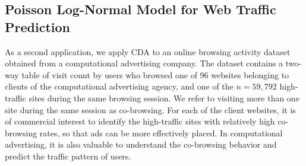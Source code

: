 \documentclass[twoside,11pt]{article}
\newcommand{\1}{\mathbf 1}
\begin{document}
{%
% 
% 
%




\subsection{Poisson Log-Normal Model for Web Traffic Prediction}
As a second application, we apply CDA to an online browsing activity dataset obtained from a computational advertising company. The dataset contains a two-way  table of visit count by users who browsed one of $96$ websites belonging to clients of the computational advertising agency, and one of the  $n=59,792$ high-traffic sites during the same browsing session. We refer to visiting more than one site during the same session as co-browsing. For each of the client websites, it is of commercial interest to identify the high-traffic sites with relatively high co-browsing rates, so that ads can be more effectively placed. In computational advertising, it is also valuable to understand the co-browsing behavior and predict the traffic pattern of users. %

}
\end{document}
